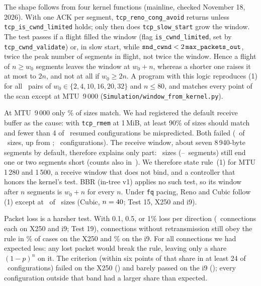 \documentclass[sigconf,9pt,nonacm]{acmart}
\newcommand{\citeone}{\cite{paperone}}
\begin{document}
The shape follows from four kernel functions (mainline, checked November 18, 2026). With one ACK per segment, \texttt{tcp\_\allowbreak reno\_\allowbreak cong\_\allowbreak avoid} returns unless \texttt{tcp\_\allowbreak is\_\allowbreak cwnd\_\allowbreak limited} holds; only then does \texttt{tcp\_\allowbreak slow\_\allowbreak start} grow the window. The test passes if a flight filled the window (flag \texttt{is\_\allowbreak cwnd\_\allowbreak limited}, set by \texttt{tcp\_\allowbreak cwnd\_\allowbreak validate}) or, in slow start, while $\texttt{snd\_\allowbreak cwnd}<2\,\texttt{max\_\allowbreak packets\_\allowbreak out}$, twice the peak number of segments in flight, not twice the window. Hence a flight of $n\ge w_0$ segments leaves the window at $w_0+n$, whereas a shorter one raises it at most to $2n$, and not at all if $w_0\ge2n$. A program with this logic reproduces (1) for all \KernPairs\ pairs of $w_0\in\{2,4,10,16,20,32\}$ and $n\le80$, and matches every point of the scan except at MTU~9\,000 (\texttt{Simulation/window\_\allowbreak from\_\allowbreak kernel.py}).

At MTU~9\,000 only \NineShare\% of sizes match. We had registered the default receive buffer as the cause: with \texttt{tcp\_rmem} at 1\,MiB, at least 90\% of sizes should match and fewer than 4 of \NineLargeN\ resumed configurations be mispredicted. Both failed (\NineRwndLargeOk\ of \NineRwndLargeTot\ sizes, up from \NineRwndDefOk; \NineLargeWrong\ configurations). The receive window, about seven 8\,940-byte segments by default, therefore explains only part: \NineFailNW\ sizes (\NineFailLo--\NineFailHi\ segments) still end one or two segments short (counts also in~\citeone). We therefore state rule~(1) for MTU 1\,280 and 1\,500, a receive window that does not bind, and a controller that honors the kernel's test. BBR (in-tree v1) applies no such test, so its window after $n$ segments is $w_0+n$ for every $n$. Under \texttt{fq} pacing, Reno and Cubic follow (1) except at \GelCubDiffW\ of \GelCubSizes\ sizes (Cubic, $n=40$; Test 15, X250 and i9).

Packet loss is a harsher test. With 0.1, 0.5, or 1\% loss per direction (\GsixConn\ connections each on X250 and i9; Test 19), connections without retransmission still obey the rule in \GsixNoRetxPct\% of cases on the X250 and \GsixINoRetxPct\% on the i9. For all connections we had expected less: any lost packet would break the rule, leaving only a share $(1-p)^n$ on it. The criterion (within six points of that share in at least 24 of \GsixCells\ configurations) failed on the X250 (\GsixWithin) and barely passed on the i9 (\GsixIWithin); every configuration outside that band had a larger share than expected.
\end{document}
